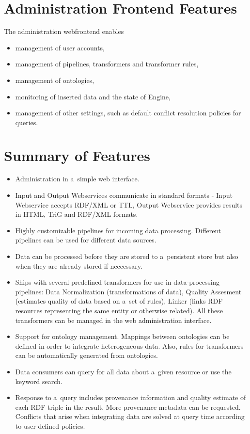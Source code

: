 \section{Administration Frontend Features}
The administration webfrontend enables
\begin{itemize}
  \item management of user accounts,
  \item management of pipelines, transformers and transformer rules,
  \item management of ontologies,
  \item monitoring of inserted data and the state of Engine,
  \item management of other settings, such as default conflict resolution policies for queries.  
\end{itemize}

\section{Summary of Features}

\begin{itemize}
  \item Administration in a~simple web interface.
  \item Input and Output Webservices communicate in standard formats - Input Webservice accepts RDF/XML or TTL, Output Webservice provides results in HTML, TriG and RDF/XML formats.
  \item Highly customizable pipelines for incoming data processing. Different pipelines can be used for different data sources.
  \item Data can be processed before they are stored to a~persistent store but also when they are already stored if neccessary.
  \item Ships with several predefined transformers for use in data-processing pipelines: Data Normalization (transformations of data), Quality Assesment (estimates quality of data based on a~set of rules), Linker (links RDF resources representing the same entity or otherwise related). All these transformers can be managed in the web administration interface.
  \item Support for ontology management. Mappings between ontologies can be defined in order to integrate heterogeneous data. Also, rules for  transformers can be automatically generated from ontologies.
  \item Data consumers can query for all data about a~given resource or use the keyword search.
  \item Response to a~query includes provenance information and quality estimate of each RDF triple in the result. More provenance metadata can be requested. Conflicts that arise when integrating data are solved at query time according to user-defined policies. 
\end{itemize}


